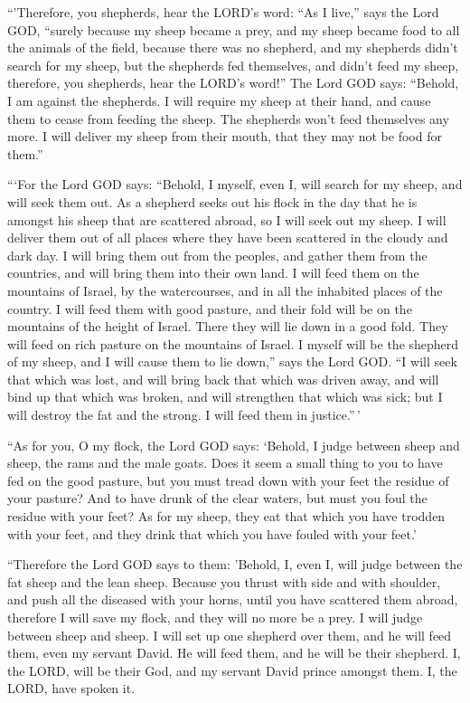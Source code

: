  ``'Therefore, you shepherds, hear the LORD's word:
 ``As I live,'' says the Lord GOD, ``surely because my
sheep became a prey, and my sheep became food to all the animals of the
field, because there was no shepherd, and my shepherds didn't search for
my sheep, but the shepherds fed themselves, and didn't feed my sheep,
 therefore, you shepherds, hear the LORD's word!''
 The Lord GOD says: ``Behold, I am against the shepherds.
I will require my sheep at their hand, and cause them to cease from
feeding the sheep. The shepherds won't feed themselves any more. I will
deliver my sheep from their mouth, that they may not be food for them.''

 ```For the Lord GOD says: ``Behold, I myself, even I,
will search for my sheep, and will seek them out.  As a
shepherd seeks out his flock in the day that he is amongst his sheep
that are scattered abroad, so I will seek out my sheep. I will deliver
them out of all places where they have been scattered in the cloudy and
dark day.  I will bring them out from the peoples, and
gather them from the countries, and will bring them into their own land.
I will feed them on the mountains of Israel, by the watercourses, and in
all the inhabited places of the country.  I will feed
them with good pasture, and their fold will be on the mountains of the
height of Israel. There they will lie down in a good fold. They will
feed on rich pasture on the mountains of Israel.  I
myself will be the shepherd of my sheep, and I will cause them to lie
down,'' says the Lord GOD.  ``I will seek that which was
lost, and will bring back that which was driven away, and will bind up
that which was broken, and will strengthen that which was sick; but I
will destroy the fat and the strong. I will feed them in justice.''\,'

 ``As for you, O my flock, the Lord GOD says: `Behold, I
judge between sheep and sheep, the rams and the male goats.
 Does it seem a small thing to you to have fed on the
good pasture, but you must tread down with your feet the residue of your
pasture? And to have drunk of the clear waters, but must you foul the
residue with your feet?  As for my sheep, they eat that
which you have trodden with your feet, and they drink that which you
have fouled with your feet.'

 ``Therefore the Lord GOD says to them: 'Behold, I, even
I, will judge between the fat sheep and the lean sheep. 
Because you thrust with side and with shoulder, and push all the
diseased with your horns, until you have scattered them abroad,
 therefore I will save my flock, and they will no more be
a prey. I will judge between sheep and sheep.  I will set
up one shepherd over them, and he will feed them, even my servant David.
He will feed them, and he will be their shepherd.  I, the
LORD, will be their God, and my servant David prince amongst them. I,
the LORD, have spoken it.

